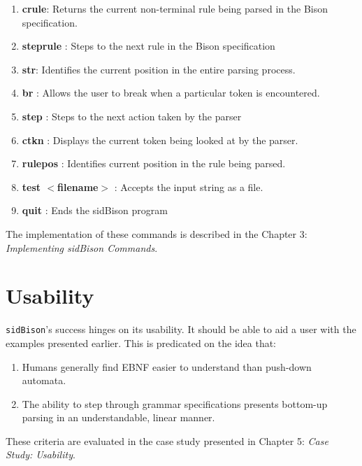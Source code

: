 \begin{enumerate}
\item \textbf{crule}: Returns the current non-terminal rule being parsed in the Bison specification.
\item \textbf{steprule} : Steps to the next rule in the Bison specification
\item \textbf{str}: Identifies the current position in the entire parsing process.
\item \textbf{br} : Allows the user to break when a particular token is encountered.
\item \textbf{step} : Steps to the next action taken by the parser
\item \textbf{ctkn} : Displays the current token being looked at by the parser.
\item \textbf{rulepos} : Identifies current position in the rule being parsed.
\item \textbf{test $<$filename$>$} : Accepts the input string as a file.
\item \textbf{quit} : Ends the sidBison program
\end{enumerate}

The implementation of these commands is described in the Chapter 3: \textit{Implementing sidBison Commands}.

\section{Usability}

\verb|sidBison|'s success hinges on its usability. It should be able to aid a user with the examples presented earlier. This is predicated on the idea that:

\begin{enumerate}
\item Humans generally find EBNF easier to understand than push-down automata.
\item The ability to step through grammar specifications presents bottom-up parsing in an understandable, linear manner.
\end{enumerate}

These criteria are evaluated in the case study presented in Chapter 5: \textit{Case Study: Usability}.



